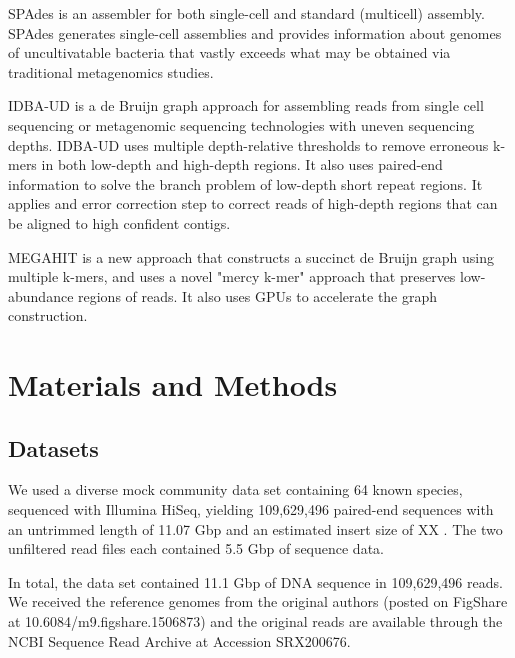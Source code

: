 SPAdes \cite{spades} is an assembler for both single-cell and standard (multicell) assembly. SPAdes generates single-cell assemblies and provides information about genomes of uncultivatable bacteria that vastly exceeds what may be obtained via traditional metagenomics studies. 

IDBA-UD \cite{idba} is a de Bruijn graph approach for assembling reads from single cell sequencing or metagenomic sequencing technologies with uneven sequencing depths. IDBA-UD uses multiple depth-relative thresholds to remove erroneous k-mers in both low-depth and high-depth regions. It also uses paired-end information  to solve the branch problem of low-depth short repeat regions. It applies and error correction step to correct reads of high-depth regions that can be aligned to high confident contigs.

MEGAHIT \cite{megahit} is a new approach that constructs a succinct de Bruijn graph using multiple k-mers, and uses a novel "mercy k-mer" approach that preserves low-abundance regions of reads. It also uses GPUs to accelerate the graph construction.
 

\section*{Materials and Methods}

\subsection*{Datasets}

We used a diverse mock community data set containing 64 known species,
sequenced with Illumina HiSeq, yielding 109,629,496 paired-end sequences with
an untrimmed length of 11.07 Gbp and an estimated insert size of XX
\cite{podar}.  The two unfiltered read files each contained 5.5 Gbp of
sequence data. %


In total, the data set contained 11.1 Gbp of DNA sequence in 109,629,496
reads.  We received the reference genomes from the original authors
(posted on FigShare at 10.6084/m9.figshare.1506873) and the original reads are available through
the NCBI Sequence Read Archive at Accession SRX200676.

